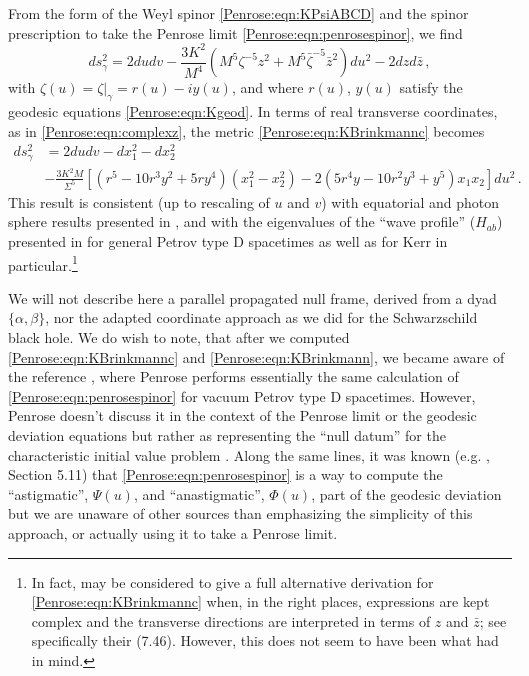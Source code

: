 From the form of the Weyl spinor \eqref{Penrose:eqn:KPsiABCD} and the spinor prescription to take the Penrose limit \eqref{Penrose:eqn:penrosespinor}, we find
\begin{equation}\label{Penrose:eqn:KBrinkmannc}
ds_{\gamma}^2 = 2 du dv - \frac{3 K^2}{M^4}\left(M^5\zeta^{-5} z^2 + M^5 \bar{\zeta}^{-5}\bar{z}^2\right) du^2 - 2 dz d\bar{z}  \, ,
\end{equation}
with $\zeta(u) = \zeta|_{\gamma} = r(u)-i y(u)$, and where $r(u)$, $y(u)$ satisfy the geodesic equations \eqref{Penrose:eqn:Kgeod}. In terms of real transverse coordinates, as in \eqref{Penrose:eqn:complexz}, the metric \eqref{Penrose:eqn:KBrinkmannc} becomes 
\begin{equation}\label{Penrose:eqn:KBrinkmann}
\begin{aligned}
ds_{\gamma}^2 &= 2 du dv  - dx_1^2 - dx_2^2  \\
&- \frac{3 K^2 M}{\Sigma^5}\left\lbrack \left(r^5-10r^3 y^2+5ry^4\right)\left(x_1^2- x_2^2\right) -2  \left(5r^4 y-10r^2 y^3 + y^5 \right)x_1 x_2 \right\rbrack du^2 \, .
\end{aligned}
\end{equation} 
This result is consistent (up to rescaling of $u$ and $v$) with equatorial and photon sphere results presented in
\cite{Igata:2019pgb,Fransen:2023eqj}, and with the eigenvalues of the ``wave profile'' ($H_{ab}$) presented in
\cite{Hollowood:2009qz} for general Petrov type D spacetimes as well as for Kerr in particular.\footnote{In fact, \cite{Hollowood:2009qz} may be considered to give a full alternative derivation for \eqref{Penrose:eqn:KBrinkmannc}  when, in the right places, expressions are kept complex and the transverse directions are interpreted in terms of $z$ and $\bar{z}$; see specifically their (7.46). However, this does not seem to have been what \cite{Hollowood:2009qz} had in mind.} 

We will not describe here a parallel propagated null frame, derived from a dyad $\lbrace\alpha,\beta \rbrace$, nor the adapted coordinate approach as we did for the Schwarzschild black hole. We do wish to note, that after we computed \eqref{Penrose:eqn:KBrinkmannc} and \eqref{Penrose:eqn:KBrinkmann}, we became aware of the reference \cite{penrose19952}, where Penrose performs essentially the same calculation of \eqref{Penrose:eqn:penrosespinor} for vacuum Petrov type D spacetimes. However, Penrose doesn't discuss it in the context of the Penrose limit or the geodesic deviation equations but rather as representing the ``null datum'' for the characteristic initial value problem \cite{penrose1980golden}. Along the same lines, it was known (e.g. \cite{Penrose:1985bww}, Section 5.11) that \eqref{Penrose:eqn:penrosespinor} is a way to compute the ``astigmatic'', $\Psi(u)$, and ``anastigmatic'', $\Phi(u)$, part of the geodesic deviation but we are unaware of other sources than \cite{Tod:2019urw} emphasizing the simplicity of this approach, or actually using it to take a Penrose limit. 

